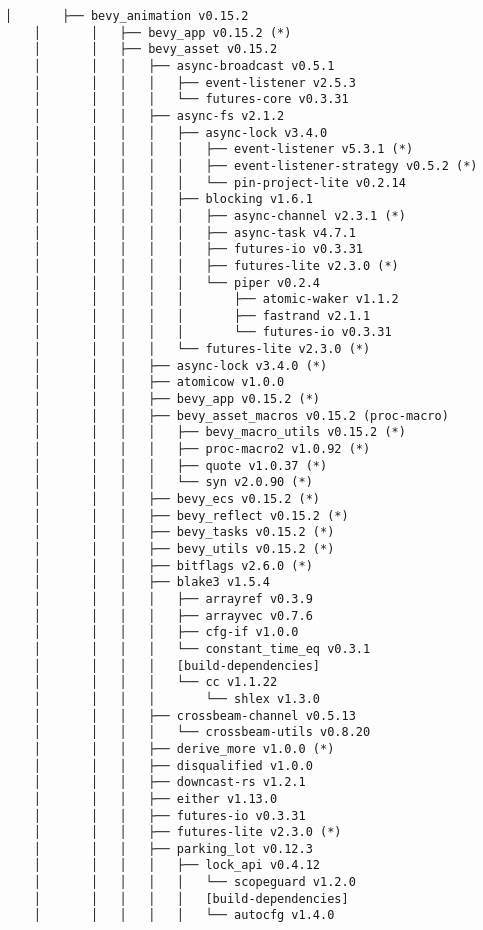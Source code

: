 \begin{lstlisting}[style=mystyle, caption={dependencias del proyecto}, label={lst:dependencias}]
    │       ├── bevy_animation v0.15.2
    │       │   ├── bevy_app v0.15.2 (*)
    │       │   ├── bevy_asset v0.15.2
    │       │   │   ├── async-broadcast v0.5.1
    │       │   │   │   ├── event-listener v2.5.3
    │       │   │   │   └── futures-core v0.3.31
    │       │   │   ├── async-fs v2.1.2
    │       │   │   │   ├── async-lock v3.4.0
    │       │   │   │   │   ├── event-listener v5.3.1 (*)
    │       │   │   │   │   ├── event-listener-strategy v0.5.2 (*)
    │       │   │   │   │   └── pin-project-lite v0.2.14
    │       │   │   │   ├── blocking v1.6.1
    │       │   │   │   │   ├── async-channel v2.3.1 (*)
    │       │   │   │   │   ├── async-task v4.7.1
    │       │   │   │   │   ├── futures-io v0.3.31
    │       │   │   │   │   ├── futures-lite v2.3.0 (*)
    │       │   │   │   │   └── piper v0.2.4
    │       │   │   │   │       ├── atomic-waker v1.1.2
    │       │   │   │   │       ├── fastrand v2.1.1
    │       │   │   │   │       └── futures-io v0.3.31
    │       │   │   │   └── futures-lite v2.3.0 (*)
    │       │   │   ├── async-lock v3.4.0 (*)
    │       │   │   ├── atomicow v1.0.0
    │       │   │   ├── bevy_app v0.15.2 (*)
    │       │   │   ├── bevy_asset_macros v0.15.2 (proc-macro)
    │       │   │   │   ├── bevy_macro_utils v0.15.2 (*)
    │       │   │   │   ├── proc-macro2 v1.0.92 (*)
    │       │   │   │   ├── quote v1.0.37 (*)
    │       │   │   │   └── syn v2.0.90 (*)
    │       │   │   ├── bevy_ecs v0.15.2 (*)
    │       │   │   ├── bevy_reflect v0.15.2 (*)
    │       │   │   ├── bevy_tasks v0.15.2 (*)
    │       │   │   ├── bevy_utils v0.15.2 (*)
    │       │   │   ├── bitflags v2.6.0 (*)
    │       │   │   ├── blake3 v1.5.4
    │       │   │   │   ├── arrayref v0.3.9
    │       │   │   │   ├── arrayvec v0.7.6
    │       │   │   │   ├── cfg-if v1.0.0
    │       │   │   │   └── constant_time_eq v0.3.1
    │       │   │   │   [build-dependencies]
    │       │   │   │   └── cc v1.1.22
    │       │   │   │       └── shlex v1.3.0
    │       │   │   ├── crossbeam-channel v0.5.13
    │       │   │   │   └── crossbeam-utils v0.8.20
    │       │   │   ├── derive_more v1.0.0 (*)
    │       │   │   ├── disqualified v1.0.0
    │       │   │   ├── downcast-rs v1.2.1
    │       │   │   ├── either v1.13.0
    │       │   │   ├── futures-io v0.3.31
    │       │   │   ├── futures-lite v2.3.0 (*)
    │       │   │   ├── parking_lot v0.12.3
    │       │   │   │   ├── lock_api v0.4.12
    │       │   │   │   │   └── scopeguard v1.2.0
    │       │   │   │   │   [build-dependencies]
    │       │   │   │   │   └── autocfg v1.4.0

\end{lstlisting}
